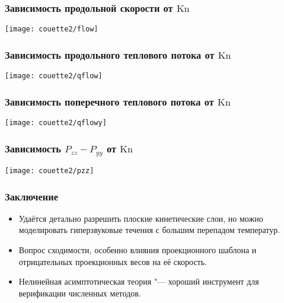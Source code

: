 \documentclass[mathserif]{beamer} %
\newcommand{\Kn}{\mathrm{Kn}}
\begin{document}
\begin{frame}
    \frametitle{Зависимость продольной скорости от \(\Kn\)}
    \vspace{-2pt}
    \centering\hspace{-1.5cm}
    \texttt{[image: couette2/flow]}
    \hspace{-1.5cm}
\end{frame}

\begin{frame}
    \frametitle{Зависимость продольного теплового потока от \(\Kn\)}
    \vspace{-2pt}
    \centering\hspace{-1.5cm}
    \texttt{[image: couette2/qflow]}
    \hspace{-1.5cm}
\end{frame}

\begin{frame}
    \frametitle{Зависимость поперечного теплового потока от \(\Kn\)}
    \vspace{-2pt}
    \centering\hspace{-1.5cm}
    \texttt{[image: couette2/qflowy]}
    \hspace{-1.5cm}
\end{frame}

\begin{frame}
    \frametitle{Зависимость \(P_{zz}-P_{yy}\) от \(\Kn\)}
    \vspace{-2pt}
    \centering\hspace{-1.5cm}
    \texttt{[image: couette2/pzz]}
    \hspace{-1.5cm}
\end{frame}

\begin{frame}
    \frametitle{Заключение}
    \begin{itemize}
        \item Удаётся детально разрешить плоские кинетические слои,
        но можно моделировать гиперзвуковые течения с большим перепадом температур.
        \item Вопрос сходимости, особенно влияния проекционного шаблона
        и отрицательных проекционных весов на её скорость.
        \item Нелинейная асимптотическая теория "--- хороший инструмент для верификации
        численных методов.
    \end{itemize}
\end{frame}
\end{document}
